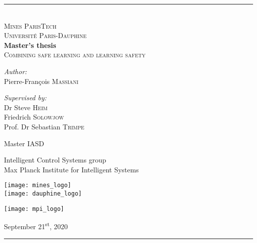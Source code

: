 
\begin{titlepage}
	
	\center  %
	
	\rule{\linewidth}{0.3mm}\\[1cm]
	
	\textsc{\LARGE Mines ParisTech}\\[0.5cm]
	\textsc{\LARGE Université Paris-Dauphine}\\[2cm]
	
	\Huge{\textbf{Master's thesis}}\\[0.3cm]
	
	\Huge{\textsc{Combining safe learning and learning safety}}\\[1.5cm]
	
	\begin{minipage}{0.4\textwidth}
		\begin{flushleft} \large
			\emph{Author:}\\
			{Pierre-François \textsc{Massiani}} %
		\end{flushleft}
	\end{minipage}
	\begin{minipage}{0.5\textwidth}
		\begin{flushright} \large
			\emph{Supervised by:} \\
			{Dr Steve \textsc{Heim}\\Friedrich \textsc{Solowjow}\\Prof. Dr Sebastian \textsc{Trimpe}} %
		\end{flushright}
	\end{minipage}
	\vfill
	
	\large{Master IASD}

	\large{Intelligent Control Systems group}\\
	\large{Max Planck Institute for Intelligent Systems}
	\vfill
	\begin{minipage}{\linewidth}
		\begin{minipage}{0.5\linewidth}
		\begin{flushleft}
			\texttt{[image: mines\_logo]}\\[1cm]
			\texttt{[image: dauphine\_logo]}
		\end{flushleft}
	\end{minipage}
	\begin{minipage}{0.5\linewidth}
		\begin{flushright}
			\texttt{[image: mpi\_logo]}
	\end{flushright}
	\end{minipage}
	\end{minipage}
	
	\vfill  %
	
	\large{September 21\textsuperscript{st}, 2020}\\[1cm]
	\rule{\linewidth}{0.3mm}
\end{titlepage}